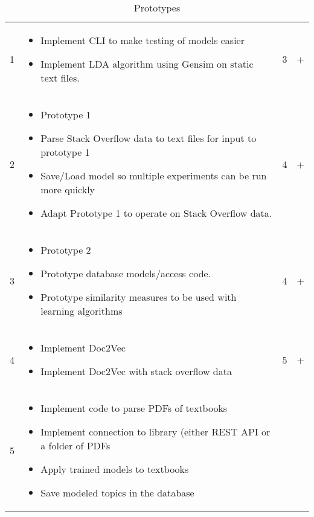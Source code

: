 \begin{table*}[t]
  \centering
  \caption{Prototypes}
  \begin{tabular}{ l p{10cm} l l}
    1 & 
        \begin{itemize}
        \item Implement CLI to make testing of models easier
        \item Implement LDA algorithm using Gensim on static text files.
        \end{itemize} &
                        3 & + \\
    2 &
        \begin{itemize}
        \item Prototype 1
        \item Parse Stack Overflow data to text files for input to prototype 1
        \item Save/Load model so multiple experiments can be run more quickly
        \item Adapt Prototype 1 to operate on Stack Overflow data.
        \end{itemize} &
                        4 & + \\
    3 &
        \begin{itemize}
        \item Prototype 2
        \item Prototype database models/access code.
        \item Prototype similarity measures to be used with learning
          algorithms
        \end{itemize} &
                        4 & + \\
    4 &
        \begin{itemize}
        \item Implement Doc2Vec
        \item Implement Doc2Vec with stack overflow data
        \end{itemize} &
                        5 & + \\
    5 &
        \begin{itemize}
        \item Implement code to parse PDFs of textbooks
        \item Implement connection to library (either REST API or a folder of PDFs
        \item Apply trained models to textbooks
        \item Save modeled topics in the database

\end{itemize}
\end{tabular}
\end{table*}
